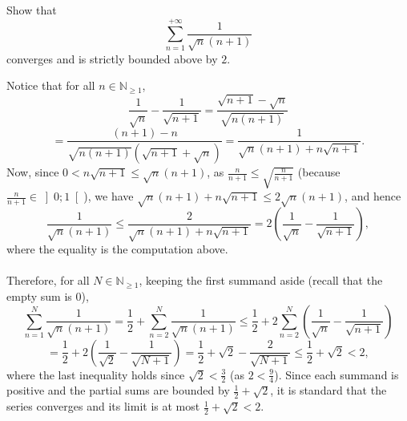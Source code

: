 \begin{problem}
    Show that
    \[
        \sum_{n=1}^{+\infty} \frac{1}{\sqrt{n}\left(n+1\right)}
    \]
    converges and is strictly bounded above by \( 2 \).
\end{problem}
\begin{solution}
    Notice that for all \( n \in \mathbb{N}_{\geq 1} \),
    \[
        \frac{1}{\sqrt{n}} - \frac{1}{\sqrt{n+1}} = \frac{\sqrt{n+1} - \sqrt{n}}{\sqrt{n\left(n+1\right)}}
    \]
    \[
        = \frac{\left(n+1\right) - n}{\sqrt{n\left(n+1\right)} \left(\sqrt{n+1} + \sqrt{n}\right)} = \frac{1}{\sqrt{n}\left(n+1\right) + n\sqrt{n+1}}.
    \]
    Now, since \( 0<n\sqrt{n+1} \leq \sqrt{n}\left(n+1\right) \), as \( \frac{n}{n+1} \leq \sqrt{\frac{n}{n+1}} \) (because \( \frac{n}{n+1} \in \left]0;1\right[ \)), we have \( \sqrt{n}\left(n+1\right) + n\sqrt{n+1} \leq 2\sqrt{n}\left(n+1\right) \), and hence
    \[
        \frac{1}{\sqrt{n}\left(n+1\right)} \leq \frac{2}{\sqrt{n}\left(n+1\right) + n\sqrt{n+1}} = 2\left(\frac{1}{\sqrt{n}} - \frac{1}{\sqrt{n+1}}\right),
    \]
    where the equality is the computation above.
    \\\\
    Therefore, for all \( N \in \mathbb{N}_{\geq 1} \), keeping the first summand aside (recall that the empty sum is \( 0 \)),
    \[
        \sum_{n=1}^{N} \frac{1}{\sqrt{n}\left(n+1\right)} = \frac{1}{2} + \sum_{n=2}^{N} \frac{1}{\sqrt{n}\left(n+1\right)} \leq \frac{1}{2} + 2 \sum_{n=2}^{N} \left(\frac{1}{\sqrt{n}} - \frac{1}{\sqrt{n+1}}\right)
    \]
    \[
        = \frac{1}{2} + 2\left(\frac{1}{\sqrt{2}} - \frac{1}{\sqrt{N+1}}\right) = \frac{1}{2} + \sqrt{2} - \frac{2}{\sqrt{N+1}} \leq \frac{1}{2} + \sqrt{2} < 2,
    \]
    where the last inequality holds since \( \sqrt{2} < \frac{3}{2} \) (as \( 2 < \frac{9}{4} \)). Since each summand is positive and the partial sums are bounded by \( \frac{1}{2} + \sqrt{2} \), it is standard that the series converges and its limit is at most \( \frac{1}{2} + \sqrt{2} < 2 \).
\end{solution}
